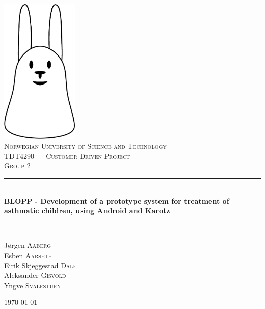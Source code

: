 \begin{titlepage}
	\begin{center}
		\includegraphics[height=7cm]{Pictures/Logo}\\[1cm]

		\textsc{\LARGE Norwegian University of Science and Technology}\\[1.5cm]

		\textsc{\Large TDT4290 --- Customer Driven Project}\\[0.2cm]
		\textsc{\Large Group 2}

		{\rule{\linewidth}{0.5mm}} \\[0.4cm]
		{\huge \bfseries BLOPP - Development of a prototype system for treatment of asthmatic children, using Android and Karotz}
		{\rule{\linewidth}{0.5mm}} \\[1.5cm]

		J{\o}rgen \textsc{Aaberg}\\
		Esben \textsc{Aarseth}\\
		Eirik Skjeggestad \textsc{Dale}\\
		Aleksander \textsc{Gisvold}\\
		Yngve \textsc{Svalestuen}

		\vfill

		{\large \today}

	\end{center}
\end{titlepage}